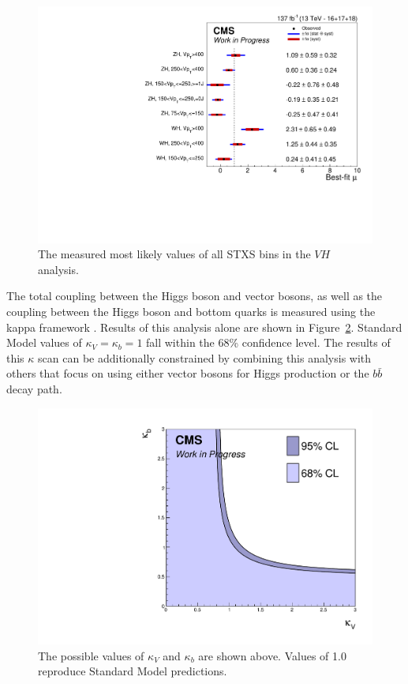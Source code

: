 \begin{figure}
  \centering
  \includegraphics[width=0.8\linewidth]{figures/210308_STXSfine_400split_unblinded_Xbb_8f854f5a_a866aef8/summary_stxs.pdf}
  \caption[Measured STXS values of $V\!H$]{
    The measured most likely values of all STXS bins in the
    $V\!H$ analysis.
  }
  \label{fig:vh-stxs}
\end{figure}

The total coupling between the Higgs boson and vector bosons, as well as the coupling between
the Higgs boson and bottom quarks is measured using the kappa framework \cite{de_Blas_2020}.
Results of this analysis alone are shown in Figure~\ref{fig:kappa}.
Standard Model values of $\kappa_V = \kappa_b = 1$ fall within the 68\% confidence level.
The results of this $\kappa$ scan can be additionally constrained by combining
this analysis with others that focus on using either vector bosons for Higgs production
or the $b\bar{b}$ decay path.

\begin{figure}
  \centering
  \includegraphics[width=0.7\linewidth]{figures/limit.pdf}
  \caption[Measured values of $\kappa_V$ and $\kappa_b$]{
    The possible values of $\kappa_V$ and $\kappa_b$ are shown above.
    Values of 1.0 reproduce Standard Model predictions.
  }
  \label{fig:kappa}
\end{figure}

